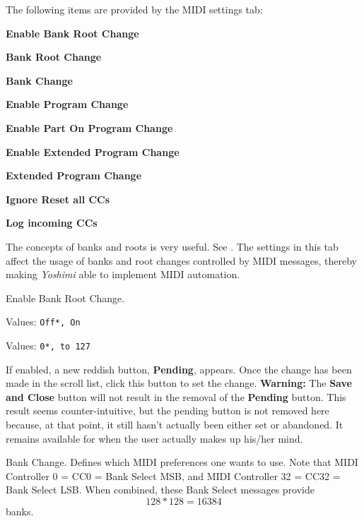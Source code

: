    The following items are provided by the MIDI settings tab:

   \begin{enumber}
      \item \textbf{Enable Bank Root Change}
      \item \textbf{Bank Root Change}
      \item \textbf{Bank Change}
      \item \textbf{Enable Program Change}
      \item \textbf{Enable Part On Program Change}
      \item \textbf{Enable Extended Program Change}
      \item \textbf{Extended Program Change}
      \item \textbf{Ignore Reset all CCs}
      \item \textbf{Log incoming CCs}
   \end{enumber}

   \setcounter{ItemCounter}{0}      %

   The concepts of banks and roots is very useful.
   See .
   The settings in this tab affect the usage of banks and root changes
   controlled by MIDI messages, thereby making \textsl{Yoshimi} able to
   implement MIDI automation.

   Enable Bank Root Change.

   Values: \texttt{Off*, On}


   Values: \texttt{0*, to 127}

   If enabled, a new reddish button, \textbf{Pending}, appears.
   Once the change has been made in the scroll list, click this button
   to set the change.
   \textbf{Warning:}
   The \textbf{Save and Close} button will not result in the removal of the
   \textbf{Pending} button.
   This result seems counter-intuitive, but the pending button is not removed
   here because, at that point, it still hasn't actually been either set or
   abandoned. It remains available for when the user actually makes up his/her
   mind.

   Bank Change.
   Defines which MIDI preferences one wants to use.
   Note that MIDI Controller 0 = CC0 = Bank Select MSB, and MIDI Controller
   32 = CC32 = Bank Select LSB.
   When combined, these Bank Select messages provide \[128*128 = 16384\]
   banks.

